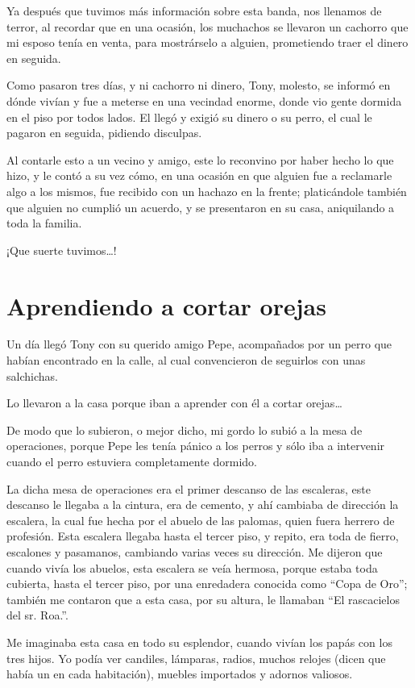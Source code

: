 \documentclass[letterpaper, 12pt]{book}
\begin{document}
Ya después que tuvimos más información sobre esta banda, nos llenamos de terror, al recordar que en una ocasión, los muchachos se llevaron un cachorro que mi esposo tenía en venta, para mostrárselo a alguien, prometiendo traer el dinero en seguida.

Como pasaron tres días, y ni cachorro ni dinero, Tony, molesto, se informó en dónde vivían y fue a meterse en una vecindad enorme, donde vio gente dormida en el piso por todos lados.  El llegó y exigió su dinero o su perro, el cual le pagaron en seguida, pidiendo disculpas.

Al contarle esto a un vecino y amigo, este lo reconvino por haber hecho lo que hizo, y le contó a su vez cómo, en una ocasión en que alguien fue a reclamarle algo a los mismos, fue recibido con un hachazo en la frente; platicándole también que alguien no cumplió un acuerdo, y se presentaron en su casa, aniquilando a toda la familia.

¡Que suerte tuvimos\ldots!

\chapter{Aprendiendo a cortar orejas}
Un día llegó Tony con su querido amigo Pepe, acompañados por un perro que habían encontrado en la calle, al cual convencieron de seguirlos con unas salchichas.

Lo llevaron a la casa porque iban a aprender con él a cortar orejas\ldots

De modo que lo subieron, o mejor dicho, mi gordo lo subió a la mesa de operaciones, porque Pepe les tenía pánico a los perros y sólo iba a intervenir cuando el perro estuviera completamente dormido.

La dicha mesa de operaciones era el primer descanso de las escaleras, este descanso le llegaba a la cintura, era de cemento, y ahí cambiaba de dirección la escalera, la cual fue hecha por el abuelo de las palomas, quien fuera herrero de profesión. Esta escalera llegaba hasta el tercer piso, y repito, era toda de fierro, escalones y pasamanos, cambiando varias veces su dirección. Me dijeron que cuando vivía los abuelos, esta escalera se veía hermosa, porque estaba toda cubierta, hasta el tercer piso, por una enredadera conocida como ``Copa de Oro''; también me contaron que a esta casa, por su altura, le llamaban ``El rascacielos del sr.  Roa.''. 

Me imaginaba  esta casa en todo su esplendor, cuando vivían los papás con los tres hijos. Yo podía ver candiles, lámparas, radios, muchos relojes (dicen que había un en cada habitación), muebles importados y adornos valiosos.
\end{document}

